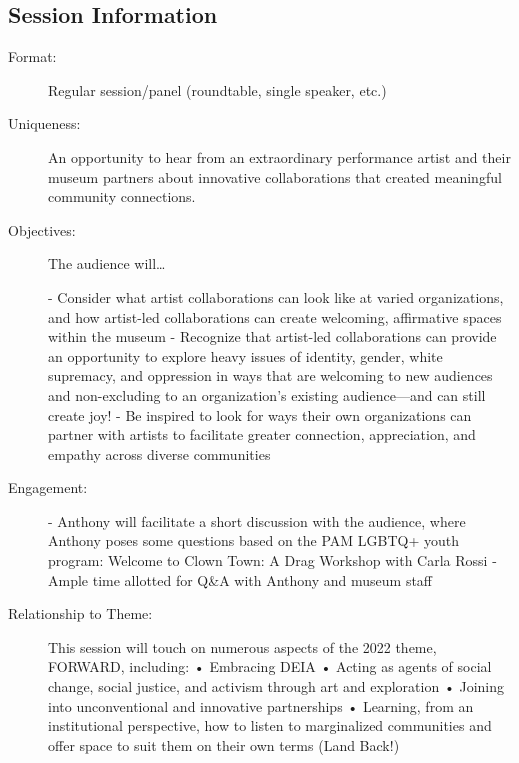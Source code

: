 \documentclass{report}
\begin{document}
              \subsection*{Session Information}
                \begin{description}
                  \item [Format:] Regular session/panel (roundtable, single speaker, etc.)
							    
							    \item [Uniqueness:]An opportunity to hear from an extraordinary performance artist and their museum partners about innovative collaborations that created meaningful community connections.
							    \item [Objectives:]The audience will…

- Consider what artist collaborations can look like at varied organizations, and how artist-led collaborations can create welcoming, affirmative spaces within the museum
- Recognize that artist-led collaborations can provide an opportunity to explore heavy issues of identity, gender, white supremacy, and oppression in ways that are welcoming to new audiences and non-excluding to an organization’s existing audience—and can still create joy!
- Be inspired to look for ways their own organizations can partner with artists to facilitate greater connection, appreciation, and empathy across diverse communities
							    \item [Engagement:]- Anthony will facilitate a short discussion with the audience, where Anthony poses some questions based on the PAM LGBTQ+ youth program: Welcome to Clown Town: A Drag Workshop with Carla Rossi
- Ample time allotted for Q\&A with Anthony and museum staff
							    \item [Relationship to Theme:]This session will touch on numerous aspects of the 2022 theme, FORWARD, including:
    • Embracing DEIA
    • Acting as agents of social change, social justice, and activism through art and exploration
    • Joining into unconventional and innovative partnerships
    • Learning, from an institutional perspective, how to listen to marginalized communities and offer space to suit them on their own terms (Land Back!)
							    
                \end{description}
\end{document}
